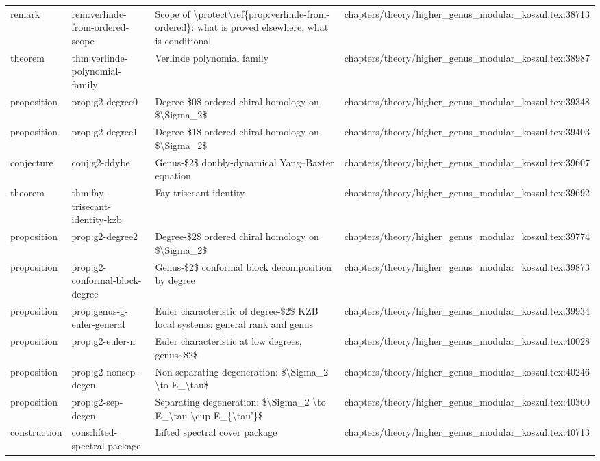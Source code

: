 \documentclass[11pt]{article}
\begin{document}
\begin{longtable}{L{0.10\textwidth}L{0.26\textwidth}L{0.42\textwidth}L{0.22\textwidth}}
remark & rem:verlinde-from-ordered-scope & Scope of \textbackslash{}protect\textbackslash{}ref\{prop:verlinde-from-ordered\}: what is proved elsewhere, what is cond{}itional & chapters/theory/higher\_genus\_modular\_koszul.tex:38713\\
theorem & thm:verlinde-polynomial-family & Verlinde polynomial family & chapters/theory/higher\_genus\_modular\_koszul.tex:38987\\
proposition & prop:g2-degree0 & Degree-\$0\$ ordered chiral homology on \$\textbackslash{}Sigma\_2\$ & chapters/theory/higher\_genus\_modular\_koszul.tex:39348\\
proposition & prop:g2-degree1 & Degree-\$1\$ ordered chiral homology on \$\textbackslash{}Sigma\_2\$ & chapters/theory/higher\_genus\_modular\_koszul.tex:39403\\
conjecture & conj:g2-ddybe & Genus-\$2\$ doubly-dynamical Yang--Baxter equation & chapters/theory/higher\_genus\_modular\_koszul.tex:39607\\
theorem & thm:fay-trisecant-identity-kzb & Fay trisecant identity & chapters/theory/higher\_genus\_modular\_koszul.tex:39692\\
proposition & prop:g2-degree2 & Degree-\$2\$ ordered chiral homology on \$\textbackslash{}Sigma\_2\$ & chapters/theory/higher\_genus\_modular\_koszul.tex:39774\\
proposition & prop:g2-conformal-block-degree & Genus-\$2\$ conformal block decomposition by degree & chapters/theory/higher\_genus\_modular\_koszul.tex:39873\\
proposition & prop:genus-g-euler-general & Euler characteristic of degree-\$2\$ KZB local systems: general rank and genus & chapters/theory/higher\_genus\_modular\_koszul.tex:39934\\
proposition & prop:g2-euler-n & Euler characteristic at low degrees, genus\textasciitilde{}\$2\$ & chapters/theory/higher\_genus\_modular\_koszul.tex:40028\\
proposition & prop:g2-nonsep-degen & Non-separating degeneration: \$\textbackslash{}Sigma\_2 \textbackslash{}to E\_\textbackslash{}tau\$ & chapters/theory/higher\_genus\_modular\_koszul.tex:40246\\
proposition & prop:g2-sep-degen & Separating degeneration: \$\textbackslash{}Sigma\_2 \textbackslash{}to E\_\textbackslash{}tau \textbackslash{}cup E\_\{\textbackslash{}tau'\}\$ & chapters/theory/higher\_genus\_modular\_koszul.tex:40360\\
construction & cons:lifted-spectral-package & Lifted spectral cover package & chapters/theory/higher\_genus\_modular\_koszul.tex:40713\\

\end{longtable}
\end{document}
